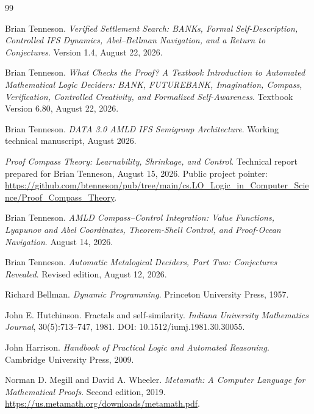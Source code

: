 \documentclass[11pt,letterpaper]{article}
\theoremstyle{remark}
\begin{document}
\begin{thebibliography}{99}

Brian Tenneson.
\newblock \emph{Verified Settlement Search: BANKs, Formal Self-Description, Controlled IFS Dynamics, Abel--Bellman Navigation, and a Return to Conjectures}.
\newblock Version 1.4, August 22, 2026.

Brian Tenneson.
\newblock \emph{What Checks the Proof? A Textbook Introduction to Automated Mathematical Logic Deciders: BANK, FUTUREBANK, Imagination, Compass, Verification, Controlled Creativity, and Formalized Self-Awareness}.
\newblock Textbook Version 6.80, August 22, 2026.

Brian Tenneson.
\newblock \emph{DATA 3.0 AMLD IFS Semigroup Architecture}.
\newblock Working technical manuscript, August 2026.

\newblock \emph{Proof Compass Theory: Learnability, Shrinkage, and Control}.
\newblock Technical report prepared for Brian Tenneson, August 15, 2026.
\newblock Public project pointer: \url{https://github.com/btenneson/pub/tree/main/cs.LO_Logic_in_Computer_Science/Proof_Compass_Theory}.

Brian Tenneson.
\newblock \emph{AMLD Compass--Control Integration: Value Functions, Lyapunov and Abel Coordinates, Theorem-Shell Control, and Proof-Ocean Navigation}.
\newblock August 14, 2026.

Brian Tenneson.
\newblock \emph{Automatic Metalogical Deciders, Part Two: Conjectures Revealed}.
\newblock Revised edition, August 12, 2026.

Richard Bellman.
\newblock \emph{Dynamic Programming}.
\newblock Princeton University Press, 1957.

John E. Hutchinson.
\newblock Fractals and self-similarity.
\newblock \emph{Indiana University Mathematics Journal}, 30(5):713--747, 1981.
\newblock DOI: 10.1512/iumj.1981.30.30055.

John Harrison.
\newblock \emph{Handbook of Practical Logic and Automated Reasoning}.
\newblock Cambridge University Press, 2009.

Norman D. Megill and David A. Wheeler.
\newblock \emph{Metamath: A Computer Language for Mathematical Proofs}.
\newblock Second edition, 2019.
\newblock \url{https://us.metamath.org/downloads/metamath.pdf}.

\end{thebibliography}
\end{document}
